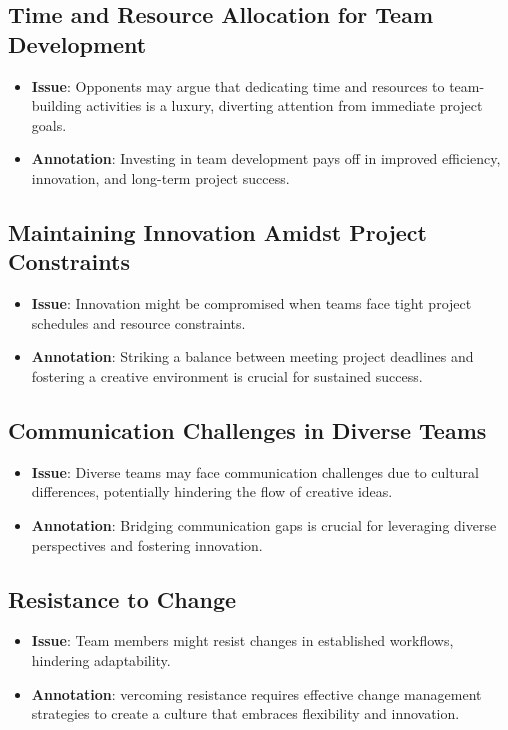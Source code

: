 \documentclass[a4paper, twoside]{article}
\begin{document}
\subsection{Time and Resource Allocation for Team Development}
\begin{itemize}
  \item \textbf{Issue}: Opponents may argue that dedicating time and resources to team-building activities is a luxury, diverting attention from immediate project goals.
  \item \textbf{Annotation}: Investing in team development pays off in improved efficiency, innovation, and long-term project success.\cite{Katzenbach1993}
\end{itemize}

\subsection{Maintaining Innovation Amidst Project Constraints}
\begin{itemize}
  \item \textbf{Issue}:  Innovation might be compromised when teams face tight project schedules and resource constraints.
  \item \textbf{Annotation}: Striking a balance between meeting project deadlines and fostering a creative environment is crucial for sustained success.\cite{Amabile2011}
\end{itemize}

\subsection{Communication Challenges in Diverse Teams}
\begin{itemize}
  \item \textbf{Issue}: Diverse teams may face communication challenges due to cultural differences, potentially hindering the flow of creative ideas.
  \item \textbf{Annotation}: Bridging communication gaps is crucial for leveraging diverse perspectives and fostering innovation.\cite{Cox1994}
\end{itemize}

\subsection{Resistance to Change}
\begin{itemize}
  \item \textbf{Issue}:  Team members might resist changes in established workflows, hindering adaptability.
  \item \textbf{Annotation}: vercoming resistance requires effective change management strategies to create a culture that embraces flexibility and innovation.\cite{Kotter1996}
\end{itemize}
\end{document}
